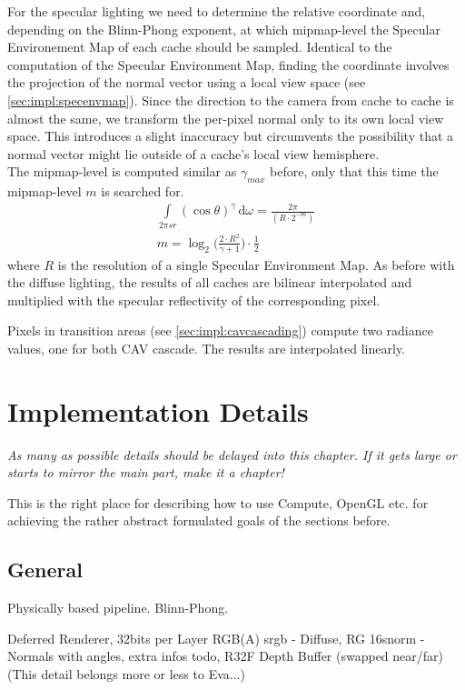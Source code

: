 \documentclass[thesis.tex]{subfiles}
\begin{document}
For the specular lighting we need to determine the relative coordinate and, depending on the Blinn-Phong exponent, at which mipmap-level the Specular Environement Map of each cache should be sampled.
Identical to the computation of the Specular Environment Map, finding the coordinate involves the projection of the normal vector using a local view space (see \autoref{sec:impl:specenvmap}).
Since the direction to the camera from cache to cache is almost the same, we transform the per-pixel normal only to its own local view space.
This introduces a slight inaccuracy but circumvents the possibility that a normal vector might lie outside of a cache's local view hemisphere.\\
The mipmap-level is computed similar as $\gamma_{max}$ before, only that this time the mipmap-level $m$ is searched for.
\begin{align}
\int\limits_{2\pi sr} (\cos\theta)^{\gamma}  \,\mathrm{d}\omega = \frac{2\pi}{(R \cdot 2^{-m})}\\
m = \log_2 \Big(\frac{2 \cdot R^2}{\gamma + 1} \Big) \cdot \frac{1}{2}
\end{align}
where $R$ is the resolution of a single Specular Environment Map.
As before with the diffuse lighting, the results of all caches are bilinear interpolated and multiplied with the specular reflectivity of the corresponding pixel.

Pixels in transition areas (see \autoref{sec:impl:cavcascading}) compute two radiance values, one for both CAV cascade.
The results are interpolated linearly.

\section{Implementation Details}
\emph{As many as possible details should be delayed into this chapter. If it gets large or starts to mirror the main part, make it a chapter!}

This is the right place for describing how to use Compute, OpenGL etc. for achieving the rather abstract formulated goals of the sections before.

\subsection{General}
Physically based pipeline.
Blinn-Phong.

Deferred Renderer, 32bits per Layer RGB(A) srgb - Diffuse, RG 16snorm - Normals with angles, extra infos todo, R32F Depth Buffer (swapped near/far)\\
(This detail belongs more or less to Eva...)
\end{document}
